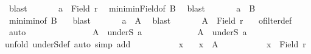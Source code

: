\begin{isabellebody}
\ blast\isanewline
\ \ \ \ \isamarkupfalse%
\ {}{\isacharcolon}{\kern0pt}\ {\isachardoublequoteopen}{\isacharquery}{\kern0pt}a\ {\isasymin}\ Field\ r{\isachardoublequoteclose}\ \isamarkupfalse%
\ minim{\isacharunderscore}{\kern0pt}inField{\isacharbrackleft}{\kern0pt}of\ {\isacharquery}{\kern0pt}B{\isacharbrackright}{\kern0pt}\ \isamarkupfalse%
\ blast\isanewline
\ \ \ \ \isamarkupfalse%
\ {}{\isacharcolon}{\kern0pt}\ {\isachardoublequoteopen}{\isacharquery}{\kern0pt}a\ {\isasymin}\ {\isacharquery}{\kern0pt}B{\isachardoublequoteclose}\ \isamarkupfalse%
\ minim{\isacharunderscore}{\kern0pt}in{\isacharbrackleft}{\kern0pt}of\ {\isacharquery}{\kern0pt}B{\isacharbrackright}{\kern0pt}\ {}\ \isamarkupfalse%
\ blast\isanewline
\ \ \ \ \isamarkupfalse%
\ {}{\isacharcolon}{\kern0pt}\ {\isachardoublequoteopen}{\isacharquery}{\kern0pt}a\ {\isasymnotin}\ A{\isachardoublequoteclose}\ \isamarkupfalse%
\ blast\isanewline
\ \ \ \ \isamarkupfalse%
\ {}{\isacharcolon}{\kern0pt}\ {\isachardoublequoteopen}A\ {\isasymle}\ Field\ r{\isachardoublequoteclose}\ \isamarkupfalse%
\ {\isacharasterisk}{\kern0pt}\ ofilter{\isacharunderscore}{\kern0pt}def\ \isamarkupfalse%
\ auto\isanewline
\ \ \ \ \isanewline
\ \ \ \ \isamarkupfalse%
\isanewline
\ \ \ \ \isamarkupfalse%
\ {\isachardoublequoteopen}A\ {\isacharequal}{\kern0pt}\ underS\ {\isacharquery}{\kern0pt}a{\isachardoublequoteclose}\isanewline
\ \ \ \ \isamarkupfalse%
\isanewline
\ \ \ \ \ \ \isamarkupfalse%
\ {\isachardoublequoteopen}A\ {\isasymle}\ underS\ {\isacharquery}{\kern0pt}a{\isachardoublequoteclose}\isanewline
\ \ \ \ \ \ \isamarkupfalse%
{\isacharparenleft}{\kern0pt}unfold\ underS{\isacharunderscore}{\kern0pt}def{\isacharcomma}{\kern0pt}\ auto\ simp\ add{\isacharcolon}{\kern0pt}\ {}{\isacharparenright}{\kern0pt}\isanewline
\ \ \ \ \ \ \ \ \isamarkupfalse%
\ x\ \isamarkupfalse%
\ {\isacharasterisk}{\kern0pt}{\isacharasterisk}{\kern0pt}{\isacharcolon}{\kern0pt}\ {\isachardoublequoteopen}x\ {\isasymin}\ A{\isachardoublequoteclose}\isanewline
\ \ \ \ \ \ \ \ \isamarkupfalse%
\ {}{}{\isacharcolon}{\kern0pt}\ {\isachardoublequoteopen}x\ {\isasymin}\ Field\ r{\isachardoublequoteclose}\ \isamarkupfalse%

\end{isabellebody}
